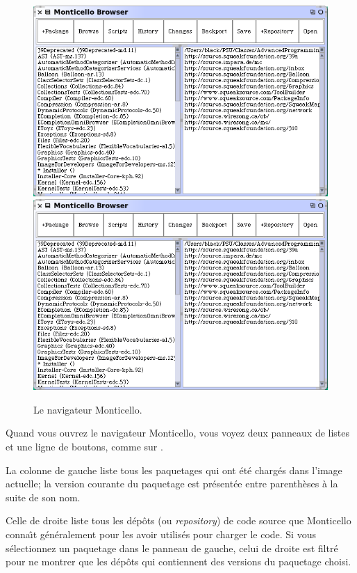 \documentclass[a4paper,10pt,twoside]{book}
\begin{document}
\begin{figure}[btp]
	\begin{center}
	\ifluluelse
		{\includegraphics[width=\textwidth]{freshMonticello}}
		{\includegraphics[scale=0.7]{freshMonticello}}
	\end{center}
	\caption{Le navigateur Monticello.}
	\label{fig:freshMonticello}
\end{figure}

Quand vous ouvrez le navigateur Monticello, vous voyez deux panneaux
de listes et une ligne de boutons, comme sur .

La colonne de gauche liste tous les paquetages qui ont \'et\'e charg\'es
dans l'image actuelle; la version courante du paquetage est
pr\'esent\'ee entre parenth\`eses \`a la suite de son nom.

Celle de droite liste tous les d\'ep\^ots (ou \emph{repository}) de code
source que Monticello conna\^{\i}t g\'en\'eralement pour les avoir utilis\'es
pour charger le code. Si vous s\'electionnez un paquetage dans le panneau de 
gauche, celui de droite est filtr\'e pour ne montrer que les d\'ep\^ots
qui contiennent des versions du paquetage choisi.
\end{document}
